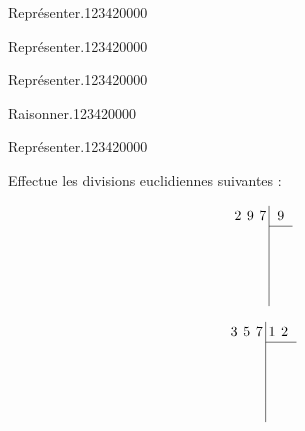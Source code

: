 \begin{pageParcoursu} 

\begin{ExoCu}{Représenter.}{1234}{2}{0}{0}{0}{0}


\end{ExoCu}
\begin{ExoCu}{Représenter.}{1234}{2}{0}{0}{0}{0}


\end{ExoCu}
\begin{ExoCu}{Représenter.}{1234}{2}{0}{0}{0}{0}

\end{ExoCu}


\begin{ExoCu}{Raisonner.}{1234}{2}{0}{0}{0}{0}

\end{ExoCu}

\begin{ExoCu}{Représenter.}{1234}{2}{0}{0}{0}{0}
  
 

\begin{enumerate}

\item Effectue les divisions euclidiennes suivantes :


\begin{minipage}{0.3\linewidth}
\begin{equation*}
\renewcommand{\arraystretch}{1.2}
\renewcommand{\arraycolsep}{2pt}
  \begin{array}{rrrr|rrr}
 & 2  & 9 & 7 & & 9 \\
\cline{5-7}
 & &  &  &  & \\
    & &  &  &   &   &  \\
    &  &  &  &   &   &  \\
    &&  &  &   &   &  \\
  \end{array}
\end{equation*}
\end{minipage}
\begin{minipage}{0.3\linewidth}
\item {}
\begin{equation*}
\renewcommand{\arraystretch}{1.2}
\renewcommand{\arraycolsep}{2pt}
  \begin{array}{rrrr|rrr}
 & 3  & 5 & 7 &  1 & 2 \\
\cline{5-7}
 & &  &  &  & \\
    & &  &  &   &   &  \\
    &  &  &  &   &   &  \\
    &&  &  &   &   &  \\
  \end{array}
\end{equation*}


\end{minipage}
\end{enumerate}
\end{ExoCu}
\end{pageParcoursu}

